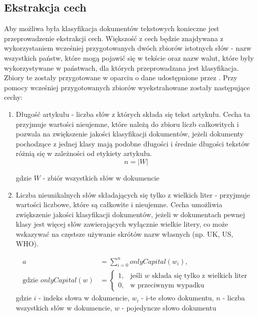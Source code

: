 \documentclass{article}
\begin{document}
\subsection{Ekstrakcja cech} \label{sec:cechy}
Aby możliwa była klasyfikacja dokumentów tekstowych konieczne jest przeprowadzenie ekstrakcji cech. Większość z cech będzie znajdywana z wykorzystaniem wcześniej przygotowanych dwóch zbiorów istotnych słów - nazw wszystkich państw, które mogą pojawić się w tekście oraz nazw walut, które były wykorzystywane w państwach, dla których przeprowadzana jest klasyfikacja. Zbiory te zostały przygotowane w oparciu o dane udostępnione przez \cite{reuters}. Przy pomocy wcześniej przygotowanych zbiorów wyekstrahowane zostały następujące cechy:
\vspace{-2mm}
\begin{enumerate}[label=c\arabic*.]  \itemsep1pt \parskip0pt 
  \item Długość artykułu - liczba słów z których składa się tekst artykułu. Cecha ta przyjmuje wartości nieujemne, które należą do zbioru liczb całkowitych i pozwala na zwiększenie jakości klasyfikacji dokumentów, jeżeli dokumenty pochodzące z jednej klasy mają podobne długości i średnie długości tekstów różnią się w zależności od etykiety artykułu.
  \begin{equation} 
        {n} = |W| 
  \end{equation}

gdzie \(W\) - zbiór wszystkich słów w dokumencie
  \item Liczba nieunikalnych słów składających się tylko z wielkich liter - przyjmuje wartości liczbowe, które są całkowite i nieujemne. Cecha umożliwia zwiększenie jakości klasyfikacji dokumentów, jeżeli w dokumentach pewnej klasy jest więcej słów zawierających wyłącznie wielkie litery, co może wskazywać na częstsze używanie skrótów nazw własnych (np. UK, US, WHO).  

\begin{subequations}
\begin{align}
a &= \sum_{i=0}^{n} onlyCapital(w_i), \label{eq:main} \\
\text{gdzie } onlyCapital(w) &= 
\begin{cases} 
1, & \text{jeśli } w \text{ składa się tylko z wielkich liter} \\
0, & \text{w przeciwnym wypadku} \label{eq:cases}
\end{cases}
\end{align}
\end{subequations}
gdzie  \(i\) - indeks słowa w dokumencie, \( w_{i} \) - i-te słowo dokumentu, \(n\) - liczba wszystkich słów w dokumencie, \(w\) - pojedyncze słowo dokumentu


\end{enumerate}
\end{document}
